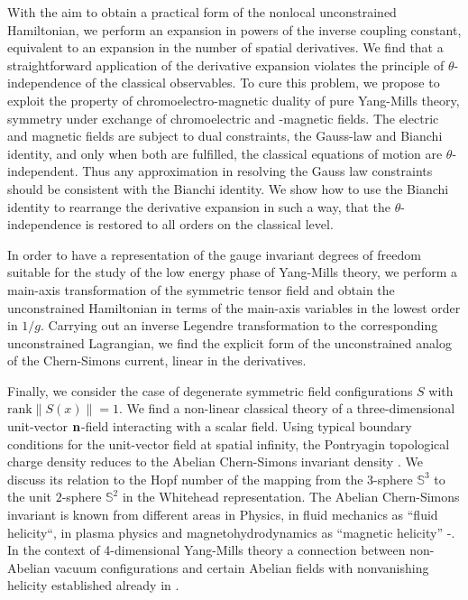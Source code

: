 \documentclass[a4paper,12pt]{article}
\begin{document}
With the aim to obtain a practical form of the nonlocal unconstrained
Hamiltonian, we perform an expansion in powers of the inverse coupling constant,
equivalent to an expansion in the number of spatial derivatives.
We find that a straightforward application of the
derivative expansion violates the principle of $\theta$-independence of the
classical observables. To cure this problem,
we propose to exploit the property of chromoelectro-magnetic duality of
pure Yang-Mills theory,
symmetry under exchange of chromoelectric and -magnetic fields.
The electric and magnetic fields are subject to
dual constraints, the Gauss-law and Bianchi identity, and
only when both are fulfilled, the
classical equations of motion are $\theta$-independent.
Thus any approximation in resolving the Gauss law constraints
should be consistent with the Bianchi identity.
We show how to use the Bianchi identity to
rearrange the derivative expansion in such a way,
that the $\theta$-independence is restored to all orders on the classical level.

In order to have a representation of the gauge invariant degrees of freedom
suitable for the study of the low energy phase of Yang-Mills theory,
we perform a main-axis transformation of the symmetric tensor field
and obtain the unconstrained Hamiltonian
in terms of the main-axis variables in the lowest order in $1/g$.
Carrying out an inverse Legendre transformation
to the corresponding unconstrained Lagrangian,
we find the explicit form of the unconstrained analog of the Chern-Simons
current, linear in the derivatives.

Finally, we consider the case of degenerate symmetric field
configurations $S$ with $\mbox{rank}\|S(x)\|= 1$.
We find a non-linear classical theory of a three-dimensional unit-vector
${\bf n}$-field interacting with a scalar field.
Using typical boundary conditions for the unit-vector field
at spatial infinity, the Pontryagin topological charge density
reduces to the Abelian Chern-Simons invariant density \cite{Jackiw}.
We discuss its relation to the Hopf number of the
mapping from the $3$-sphere $\mathbb{S}^3$ to the unit $2$-sphere $\mathbb{S}^2$
in the Whitehead representation\cite{Whitehead}.
The Abelian Chern-Simons invariant is known from different areas in
Physics, in fluid mechanics as ``fluid helicity``,
in plasma physics and magnetohydrodynamics  as ``magnetic helicity''
\cite{Woltier}-\cite{Saffman}.
In the context of 4-dimensional Yang-Mills theory a connection between
non-Abelian vacuum configurations and certain Abelian fields with nonvanishing
helicity established already in \cite{JackiwPi,NairJackiw}.
\end{document}
